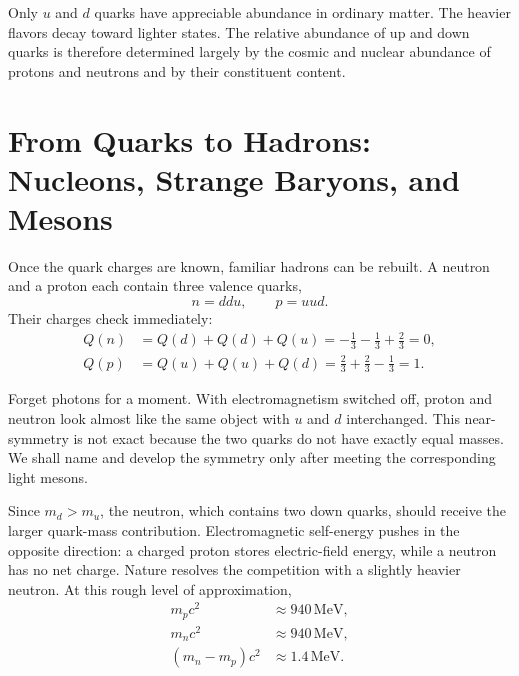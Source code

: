 Only \(u\) and \(d\) quarks have appreciable abundance in ordinary matter. The heavier flavors decay toward lighter states. The relative abundance of up and down quarks is therefore determined largely by the cosmic and nuclear abundance of protons and neutrons and by their constituent content.

\begin{classroomqa}
\end{classroomqa}

\section{From Quarks to Hadrons: Nucleons, Strange Baryons, and Mesons}

Once the quark charges are known, familiar hadrons can be rebuilt. A neutron and a proton each contain three valence quarks,
\begin{equation}
n=ddu,
\qquad
p=uud.
\end{equation}
Their charges check immediately:
\begin{align}
Q(n) &= Q(d)+Q(d)+Q(u)
= -\frac13-\frac13+\frac23
=0,\\
Q(p) &= Q(u)+Q(u)+Q(d)
= \frac23+\frac23-\frac13
=1.
\end{align}

Forget photons for a moment. With electromagnetism switched off, proton and neutron look almost like the same object with \(u\) and \(d\) interchanged. This near-symmetry is not exact because the two quarks do not have exactly equal masses. We shall name and develop the symmetry only after meeting the corresponding light mesons.

Since \(m_d>m_u\), the neutron, which contains two down quarks, should receive the larger quark-mass contribution. Electromagnetic self-energy pushes in the opposite direction: a charged proton stores electric-field energy, while a neutron has no net charge. Nature resolves the competition with a slightly heavier neutron. At this rough level of approximation,
\begin{align}
m_pc^2&\approx940\,\mathrm{MeV},\\
m_nc^2&\approx940\,\mathrm{MeV},\\
(m_n-m_p)c^2&\approx1.4\,\mathrm{MeV}.
\end{align}

